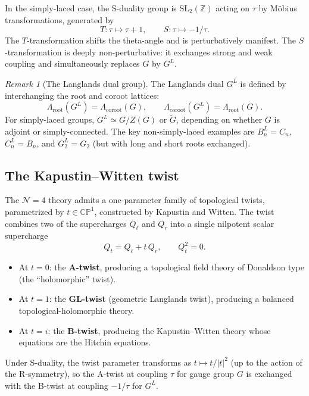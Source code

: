 \documentclass[11pt]{article}
\theoremstyle{definition}
\theoremstyle{remark}
\newtheorem{remark}[theorem]{Remark}
\begin{document}
In the simply-laced case, the S-duality group is $\mathrm{SL}_2(\mathbb{Z})$
acting on $\tau$ by M\"obius transformations, generated by
\[
 T \colon \tau \mapsto \tau + 1, \qquad
 S \colon \tau \mapsto -1/\tau.
\]
The $T$-transformation shifts the theta-angle and is perturbatively manifest.
The $S$-transformation is deeply non-perturbative: it exchanges strong and weak
coupling and simultaneously replaces $G$ by $G^L$.

\begin{remark}[The Langlands dual group]
\label{rem:langlands-dual}
The Langlands dual $G^L$ is defined by interchanging the root and coroot
lattices:
\[
 \Lambda_{\mathrm{root}}(G^L) = \Lambda_{\mathrm{coroot}}(G), \qquad
 \Lambda_{\mathrm{coroot}}(G^L) = \Lambda_{\mathrm{root}}(G).
\]
For simply-laced groups, $G^L \simeq G/Z(G)$ or $\widetilde{G}$, depending on
whether $G$ is adjoint or simply-connected. The key non-simply-laced examples
are $B_n^L = C_n$, $C_n^L = B_n$, and $G_2^L = G_2$ (but with long and short
roots exchanged).
\end{remark}

\subsection{The Kapustin--Witten twist}
\label{subsec:kw-twist}

The $\mathcal{N}=4$ theory admits a one-parameter family of topological twists,
parametrized by $t \in \mathbb{CP}^1$, constructed by Kapustin and Witten.
The twist combines two of the supercharges $Q_\ell$ and $Q_r$ into a single
nilpotent scalar supercharge
\[
 Q_t = Q_\ell + t \, Q_r, \qquad Q_t^2 = 0.
\]

\begin{itemize}
 \item At $t = 0$: the \textbf{A-twist}, producing a topological field theory
 of Donaldson type (the ``holomorphic'' twist).
 \item At $t = 1$: the \textbf{GL-twist} (geometric Langlands twist),
 producing a balanced topological-holomorphic theory.
 \item At $t = i$: the \textbf{B-twist}, producing the Kapustin--Witten
 theory whose equations are the Hitchin equations.
\end{itemize}

Under S-duality, the twist parameter transforms as $t \mapsto t/|t|^2$ (up to
the action of the R-symmetry), so the A-twist at coupling $\tau$ for gauge
group $G$ is exchanged with the B-twist at coupling $-1/\tau$ for $G^L$.
\end{document}
